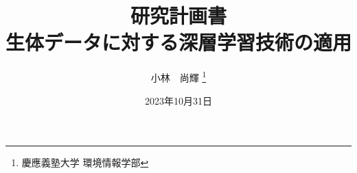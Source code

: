 \title{
    研究計画書\\
    生体データに対する深層学習技術の適用
}
\author{
    小林~~尚輝 \thanks{慶應義塾大学 環境情報学部}
}
\date{2023年10月31日}
\maketitle